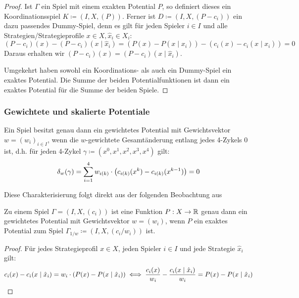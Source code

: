 \begin{proof}
	Ist $\Gamma$ ein Spiel mit einem exakten Potential $P$, so definiert dieses ein Koordinationsspiel $K \coloneqq (I, X, (P))$. Ferner ist $D \coloneqq (I, X, (P-c_i))$ ein dazu passendes Dummy-Spiel, denn es gilt für jeden Spieler $i \in I$ und alle Strategien/Strategieprofile $x \in X, \hat{x}_i \in X_i$:
		\[(P-c_i)(x) - (P-c_i)(x \mid \hat{x}_i) = \left(P(x) - P(x \mid \hat{x}_i)\right) - \left(c_i(x) - c_i(x \mid \hat{x}_i)\right) = 0 \]
	Daraus erhalten wir $(P-c_i)(x) = (P-c_i)(x \mid \hat{x}_i)$.
	
	Umgekehrt haben sowohl ein Koordinations- als auch ein Dummy-Spiel ein exaktes Potential. Die Summe der beiden Potentialfunktionen ist dann ein exaktes Potential für die Summe der beiden Spiele.
\end{proof}


\subsubsection{Gewichtete und skalierte Potentiale}

\begin{satz}\label{satz:CharGewPot}
	Ein Spiel besitzt genau dann ein gewichtetes Potential mit Gewichtsvektor $w = (w_i)_{i \in I}$, wenn die $w$-gewichtete Gesamtänderung entlang jedes 4-Zykels $0$ ist, d.h. für jeden 4-Zykel $\gamma \coloneqq (x^0, x^1, x^2, x^3, x^4)$ gilt:
		\[\delta_w(\gamma) = \sum_{i=1}^4 w_{i(k)}\cdot\left(c_{i(k)}(x^k) - c_{i(k)}(x^{k-1})\right) = 0\]
\end{satz}

Diese Charakterisierung folgt direkt aus der folgenden Beobachtung aus \cite[Kapitel 3.2]{CharExGewPotinWCG}

\begin{beob}\label{beob:ZshExGewPot}
	Zu einem Spiel $\Gamma = (I, X, (c_i))$ ist eine Funktion $P: X \to \mathbb{R}$ genau dann ein gewichtetes Potential mit Gewichtsvektor $w = (w_i)$, wenn $P$ ein exaktes Potential zum Spiel $\Gamma_{1/w} \coloneqq (I, X, (c_i/w_i))$ ist.
\end{beob}

\begin{proof}
	Für jedes Strategieprofil $x \in X$, jeden Spieler $i \in I$ und jede Strategie $\hat{x}_i$ gilt:
		\[c_i(x) - c_i(x \mid \hat{x}_i) = w_i\cdot(P(x) - P(x \mid \hat{x}_i)) \iff \frac{c_i(x)}{w_i} - \frac{c_i(x \mid \hat{x}_i)}{w_i} = P(x) - P(x \mid \hat{x}_i) \qedhere\]
\end{proof}

